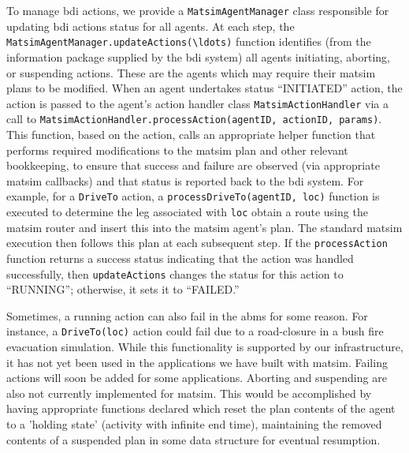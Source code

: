 To manage \gls{bdi} actions, we provide a \lstinline{MatsimAgentManager} class
responsible for updating \gls{bdi} actions status for all agents.
At each step, the \lstinline{MatsimAgentManager.updateActions(\ldots)} function
  identifies (from the information package supplied by the \gls{bdi} system)
  all agents initiating, aborting, or suspending
  actions. These are the agents which may require their \gls{matsim} plans
  to be modified.  When an agent undertakes   
  status ``INITIATED'' action, the action is passed to the agent's action handler 
  class \lstinline{MatsimActionHandler} via a call to
  \lstinline{MatsimActionHandler.processAction(agentID, actionID, params)}.
  This function, based on the action, calls an appropriate helper
  function that performs required modifications to the \gls{matsim} plan and other
  relevant bookkeeping, to ensure that success and failure are observed
  (via appropriate \gls{matsim} callbacks) and that status is reported back
  to the \gls{bdi} system.  
%
For example, for a \lstinline{DriveTo} action, a
\lstinline{processDriveTo(agentID, loc)} function is executed to determine the leg 
associated with \lstinline{loc} obtain a route using the \gls{matsim} router and
insert this into the \gls{matsim} agent's plan. The standard \gls{matsim} execution then
follows this plan at each subsequent step. 
If the \lstinline{processAction} function returns a success
  status indicating that the action was handled successfully, then
  \lstinline{updateActions} changes the status for this
  action to ``RUNNING''; otherwise, it sets it to ``FAILED.''   
  
 Sometimes, a running
  action can also  fail in the \gls{abms} for some reason. For
  instance, a \lstinline{DriveTo(loc)} action could fail due to a
  road-closure in a bush fire evacuation simulation.
  While this
  functionality is supported by our infrastructure, it has not yet been used
  in the applications we have built with \gls{matsim}. Failing actions will
  soon be added for some applications.
  Aborting and suspending are also not currently
  implemented for \gls{matsim}.  This would be accomplished by having appropriate
  functions declared which reset the plan contents of the agent to 
  a 'holding state' (activity with infinite end time),
  maintaining the removed contents of a suspended plan in some data
  structure for eventual resumption.
  
